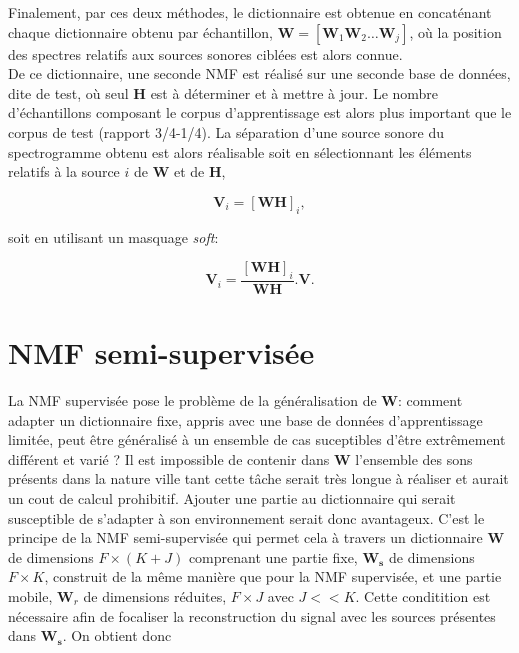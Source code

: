 Finalement, par ces deux méthodes, le dictionnaire est obtenue en concaténant chaque dictionnaire obtenu par échantillon, $\mathbf{W} = \left[\mathbf{W}_1 \mathbf{W}_2 \dots \mathbf{W}_j\right]$, où la position des spectres relatifs aux sources sonores ciblées est alors connue. \\

De ce dictionnaire, une seconde NMF est réalisé sur une seconde base de données, dite de test, où seul $\mathbf{H}$ est à déterminer et à mettre à jour.  Le nombre d'échantillons composant le corpus d'apprentissage est alors plus important que le corpus de test (rapport 3/4-1/4). La séparation d'une source sonore du spectrogramme obtenu est alors réalisable soit en sélectionnant les éléments relatifs à la source $i$ de $\mathbf{W}$ et de $\mathbf{H}$,  

\begin{equation}
\mathbf{V}_i = \left[\mathbf{WH}\right]_i, 
\end{equation}

soit en utilisant un masquage \textit{soft}: 

\begin{equation}
\mathbf{V}_i = \frac{\left[\mathbf{WH}\right]_i}{\mathbf{WH}}.\mathbf{V}.
\end{equation}



\section{NMF semi-supervisée}\label{NMF_SS}
La NMF supervisée pose le problème de la généralisation de $\mathbf{W}$: comment adapter un dictionnaire fixe, appris avec une base de données d'apprentissage limitée, peut être généralisé à un ensemble de cas suceptibles d'être extrêmement différent et varié ? 
Il est impossible de contenir dans $\mathbf{W}$ l'ensemble des sons présents dans la nature ville tant cette tâche serait très longue à réaliser et aurait un cout de calcul prohibitif. Ajouter une partie au dictionnaire qui serait susceptible de s'adapter à son environnement serait donc avantageux. C'est le principe de la NMF semi-supervisée \cite{lee_semi-supervised_2010, smaragdis2007supervised} qui permet cela à travers un dictionnaire $\mathbf{W}$ de dimensions $F \times (K+J)$ comprenant une partie fixe, $\mathbf{W_s}$ de dimensions $F \times K$, construit de la même manière que pour la NMF supervisée, et une partie mobile,  $\mathbf{W}_r$ de dimensions réduites, $F \times J$ avec $J << K$. Cette conditition est nécessaire afin de focaliser la reconstruction du signal avec les sources présentes dans $\mathbf{W_s}$. On obtient donc 

